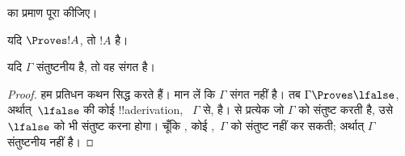 \documentclass[../../../include/open-logic-section]{subfiles}
\begin{document}
\begin{prob}
   का प्रमाण पूरा कीजिए।
\end{prob}
\tagendprob

\begin{cor}
यदि $\Proves !A$, तो $!A$  है।
\end{cor}

\begin{cor}
यदि $\Gamma$ संतुष्टनीय है, तो वह संगत है।
\end{cor}

\begin{proof}
हम प्रतिधन कथन सिद्ध करते हैं। मान लें कि $\Gamma$ संगत नहीं है। तब
$\Gamma \Proves \lfalse$, अर्थात्~$\lfalse$ की कोई !!a{derivation},
~$\Gamma$ से, है।  से प्रत्येक
जो $\Gamma$ को संतुष्ट करती है, उसे~$\lfalse$ को भी संतुष्ट करना होगा। चूँकि
, कोई
,~$\Gamma$ को संतुष्ट नहीं कर सकती;
अर्थात् $\Gamma$ संतुष्टनीय नहीं है।
\end{proof}
\end{document}
